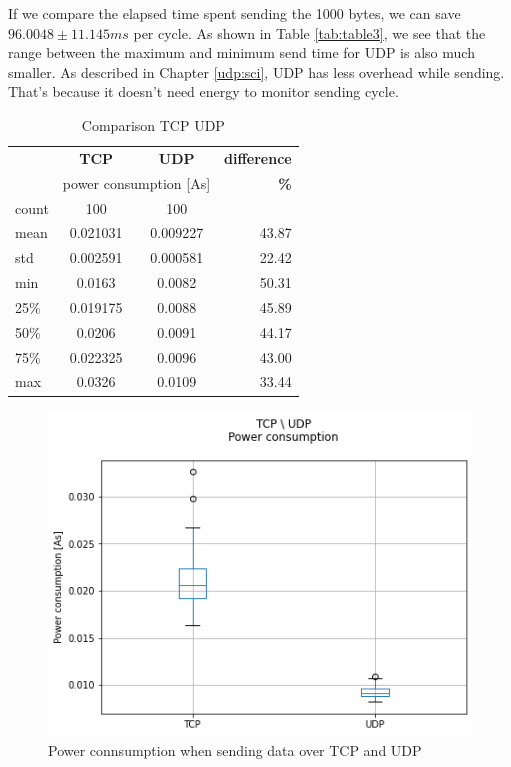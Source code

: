 If we compare the elapsed time spent sending the 1000 bytes,
we can save $96.0048 \pm 11.145 ms$ per cycle.
As shown in Table \ref{tab:table3},
we see that the range between the maximum and minimum send time for UDP is also much smaller.
As described in Chapter \ref{udp:sci}, UDP has less overhead while sending.
That's because it doesn't need energy to monitor sending cycle.
\begin{table}[H]
    \begin{center}
    \caption{Comparison TCP UDP}
    \label{tab:table4}
    \renewcommand{\arraystretch}{1.8}
    \begin{tabular}{l|c|c|r}
    & \textbf{TCP} & \textbf{{UDP}} & \textbf{difference} \\
    & \multicolumn{2}{c|}{ power consumption [As]} & \textbf{\%}\\
    \hline
    count & 100 & 100 & \\
    mean   & 0.021031 & 0.009227 & 43.87 \\
    std    & 0.002591 & 0.000581 & 22.42 \\
    min    & 0.0163 & 0.0082 & 50.31 \\
    25\%   & 0.019175 & 0.0088 & 45.89 \\
    50\%   & 0.0206 & 0.0091 & 44.17 \\
    75\%   & 0.022325 & 0.0096 & 43.00 \\
    max    & 0.0326 & 0.0109 & 33.44 \\
    \end{tabular}
    \end{center}
\end{table}
\begin{figure}[H]
    \centering
    \includegraphics[width = 0.9 \linewidth]{fig/udp_tcp/udp_tcp_boxplot_As.png}
    \caption{Power connsumption when sending data over TCP and UDP}
    \label{fig:udp_tcp_boxplot_As}
    \end{figure}

